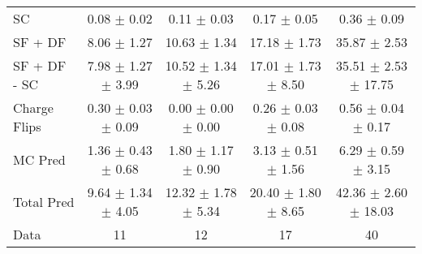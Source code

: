 \begin{tabular}{l|cccc}
                                 SC &  0.08 $\pm$  0.02 &  0.11 $\pm$  0.03 &  0.17 $\pm$  0.05 &  0.36 $\pm$  0.09 \\
                            SF + DF &  8.06 $\pm$  1.27 & 10.63 $\pm$  1.34 & 17.18 $\pm$  1.73 & 35.87 $\pm$  2.53 \\
\hline
                       SF + DF - SC &  7.98 $\pm$  1.27 $\pm$  3.99 & 10.52 $\pm$  1.34 $\pm$  5.26 & 17.01 $\pm$  1.73 $\pm$  8.50 & 35.51 $\pm$  2.53 $\pm$ 17.75 \\
\hline\hline
                       Charge Flips &  0.30 $\pm$  0.03 $\pm$  0.09 &  0.00 $\pm$  0.00 $\pm$  0.00 &  0.26 $\pm$  0.03 $\pm$  0.08 &  0.56 $\pm$  0.04 $\pm$  0.17 \\
\hline
                            MC Pred &  1.36 $\pm$  0.43 $\pm$  0.68 &  1.80 $\pm$  1.17 $\pm$  0.90 &  3.13 $\pm$  0.51 $\pm$  1.56 &  6.29 $\pm$  0.59 $\pm$  3.15 \\
\hline
                         Total Pred &  9.64 $\pm$  1.34 $\pm$  4.05 & 12.32 $\pm$  1.78 $\pm$  5.34 & 20.40 $\pm$  1.80 $\pm$  8.65 & 42.36 $\pm$  2.60 $\pm$ 18.03 \\
\hline\hline
                               Data &    11 &    12 &    17 &    40 \\
\hline\hline
\end{tabular}

